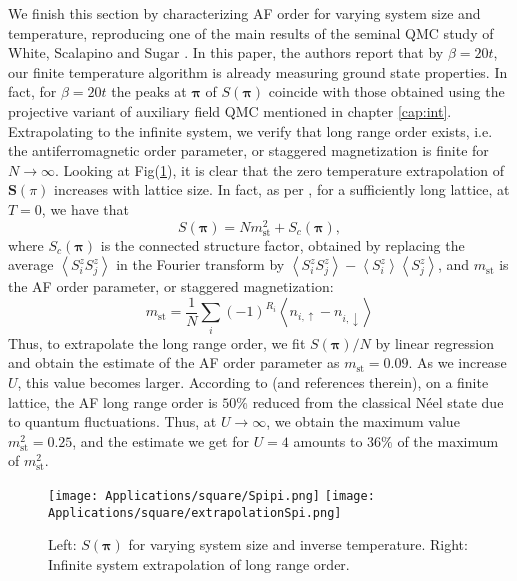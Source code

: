 \vspace{-0.5cm}
We finish this section by characterizing \ac{AF} order for varying system size and temperature, reproducing one of the main results of the seminal \ac{QMC} study of White, Scalapino and Sugar \cite{white_numerical_1989}.
In this paper, the authors report that by $\beta = 20 t$, our finite temperature algorithm is already measuring ground state properties.
In fact, for $\beta = 20 t$ the peaks at $\bm \pi$ of $S ( \bm \pi )$ coincide with those obtained using the projective variant of auxiliary field \ac{QMC} mentioned in chapter \ref{cap:int}.
Extrapolating to the infinite system, we verify that long range order exists, i.e. the antiferromagnetic order parameter, or staggered magnetization is finite for $N \rightarrow \infty$.
Looking at Fig(\ref{fig:spipi}), it is clear that the zero temperature extrapolation of $\bm S (\pi)$ increases with lattice size.
In fact, as per \cite{hirsch_two-dimensional_1985}, for a sufficiently long lattice, at $T= 0$, we have that
\begin{equation}
S(\bm \pi) = N m_{\text{st}}^2 + S_c ( \bm \pi ) ,
\end{equation}
where $S_c ( \bm \pi )$ is the connected structure factor, obtained by replacing the average $\left\langle S^z_i S^z_j \right\rangle$ in the Fourier transform by $\left\langle S^z_i S^z_j \right\rangle - \left\langle S^z_i \right\rangle \left\langle S^z_j \right\rangle$, and $m_{\text{st}}$ is the \ac{AF} order parameter, or staggered magnetization:
\begin{equation}
m_{\text{st}} = \frac{1}{N} \sum_i (-1)^{R_i} \left\langle n_{i,\uparrow} - n_{i,\downarrow} \right\rangle
\end{equation}
Thus, to extrapolate the long range order, we fit $S ( \bm \pi ) / N$ by linear regression and obtain the estimate of the \ac{AF} order parameter as $m_{\text{st}} = 0.09$.
As we increase $U$, this value becomes larger.
According to \cite{hirsch_two-dimensional_1985} (and references therein), on a finite lattice, the \ac{AF} long range order is $50 \%$ reduced from the classical Néel state due to quantum fluctuations.
Thus, at $U \rightarrow \infty$, we obtain the maximum value $m_{\text{st}}^2 = 0.25$, and the estimate we get for $U=4$ amounts to $36\%$ of the maximum of $m_{\text{st}}^2$.
\vspace{-0.3cm}
\begin{figure}[H]
\hspace{-0.4cm}
\texttt{[image: Applications/square/Spipi.png]}
\texttt{[image: Applications/square/extrapolationSpi.png]}
\caption[$S ( \bm \pi ) $ for varying system size and inverse temperature.
Infinite system extrapolation of long range order.]{Left: $S ( \bm \pi ) $ for varying system size and inverse temperature.
Right: Infinite system extrapolation of long range order. \label{fig:spipi} }
\end{figure}